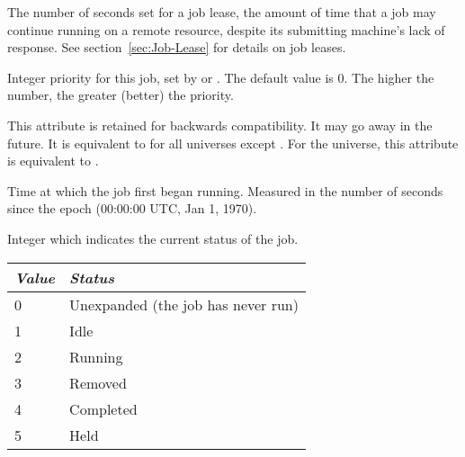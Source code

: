 \begin{description}
\item[\AdAttr{JobLeaseDuration}:]  The number of seconds set for
a job lease, the amount of time that a job may continue running
on a remote resource,
despite its submitting machine's lack of response.
See section~\ref{sec:Job-Lease} for details on job leases.

\item[\AdAttr{JobPrio}:]  Integer priority for this job, set by
 or .  The default value is 0.  The higher
the number, the greater (better) the priority.

\item[\AdAttr{JobRunCount}:]  This attribute is retained for backwards
  compatibility.  It may go away in the future.  It is equivalent to
   for all universes except .
  For the  universe, this attribute is equivalent to
  .

\item[\AdAttr{JobStartDate}:]  Time at which the job first began
running.  Measured in the
number of seconds since the epoch (00:00:00 UTC, Jan 1, 1970).

\item[\AdAttr{JobStatus}:]  Integer which indicates the current
status of the job.
\begin{center}
\begin{table}[hbt]
\begin{tabular}{|p{2cm}p{10cm}|} \hline
\emph{Value} & \emph{Status} \\ \hline \hline
0 & Unexpanded (the job has never run) \\ \hline
1 & Idle \\ \hline
2 & Running \\ \hline
3 & Removed \\ \hline
4 & Completed \\ \hline
5 & Held \\ \hline
\end{tabular}
\end{table}
\end{center}


\end{description}
